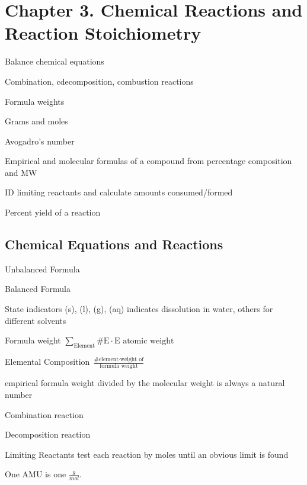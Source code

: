 \section{Chapter 3. Chemical Reactions and Reaction Stoichiometry}

\secttoc

{\footnotesize
\begin{multicols}{3}
\begin{compactenum}
    \item Balance chemical equations
    \item Combination, cdecomposition, combustion reactions
    \item Formula weights
    \item Grams and moles
    \item Avogadro's number
    \item Empirical and molecular formulas of a compound from percentage composition and MW
    \item ID limiting reactants and calculate amounts consumed/formed
    \item Percent yield of a reaction
\end{compactenum}
\end{multicols}
}

\begin{mdframed}
\begin{multicols}{2}
\subsection{Chemical Equations and Reactions}
\begin{compactdesc}
\item[Unbalanced Formula] 
\item[Balanced Formula] 
\item[State indicators] (s), (l), (g), (aq) indicates dissolution in water,
    others for different solvents
\item[Formula weight]
    $\sum_\text{Element} \#\text{E} \cdot \text{E atomic weight}$
\item[Elemental Composition] $\frac{\text{\# element} \cdot \text{weight of}}
                                   {\text{formula weight}}$
\item[] empirical formula weight divided by the molecular weight is always
    a natural number
\item[Combination reaction] 
\item[Decomposition reaction] 
\item[Limiting Reactants] test each reaction by moles until an obvious limit is
    found
\item[One AMU] is one $\frac{g}{mol}$.
\end{compactdesc}
\end{multicols}
\end{mdframed}







